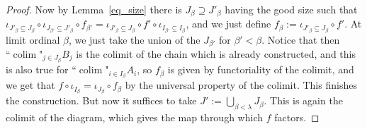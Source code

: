 \documentclass{article}
\newcommand{\fcolim}{\text{``}\colim\text{"}}
\newcommand{\colim}{\operatorname{colim}}
\begin{document}
\begin{proof}
    Now by Lemma~\ref{eq_size} there is $J_\beta\supseteq J'_{\beta}$ having the good size such that $\iota_{J'_{\beta}\subseteq J_\beta}\circ\iota_{J_{\beta'}\subseteq J'_{\beta}}\circ f_{\beta'}=\iota_{J'_{\beta}\subseteq J_\beta}\circ f'\circ\iota_{I_{\beta'}\subseteq I_\beta}$, and we just define $f_\beta:=\iota_{J'_{\beta}\subseteq J_\beta}\circ f'$. At limit ordinal $\beta$, we just take the union of the $J_{\beta'}$ for $\beta'<\beta$. Notice that then $\fcolim_{j\in J_\beta}B_j$ is the colimit of the chain which is already constructed, and this is also true for $\fcolim_{i\in I_\beta}A_i$, so $f_\beta$ is given by functoriality of the colimit, and we get that $f\circ\iota_{I_\beta}=\iota_{J_\beta}\circ f_\beta$ by the universal property of the colimit. This finishes the construction. But now it suffices to take $J':=\bigcup_{\beta<\lambda}J_\beta$. This is again the colimit of the diagram, which gives the map through which $f$ factors.
\end{proof}
\end{document}
